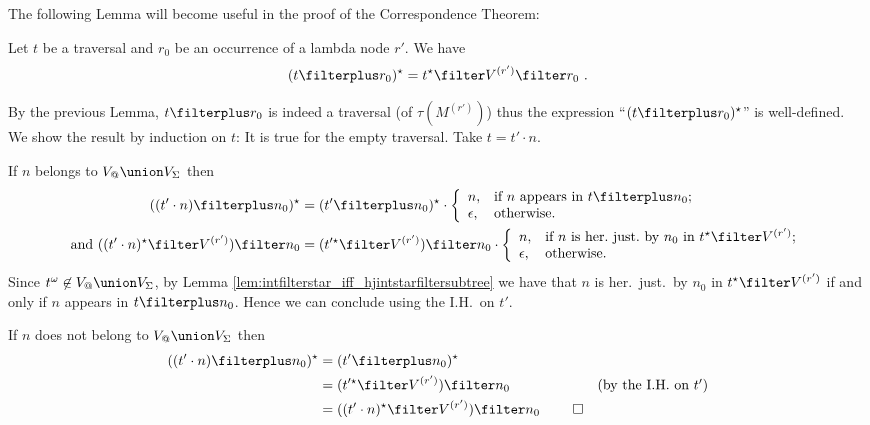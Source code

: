 The following Lemma will become useful in the proof of the Correspondence Theorem:

\begin{lemma} \label{lem:tstarproj_eq_tprojplusstar} Let $t$ be a traversal and $r_0$ be an occurrence of a
lambda node $r'$. We have
\begin{equation*}
(t\filterplus r_0)^\star = t^\star \filter V^{(r')} \filter r_0\ .
\end{equation*}
\end{lemma}
\proof By the previous Lemma, $t\filterplus r_0$ is indeed a
traversal (of $\tau(M^{(r')})$) thus the expression ``$(t\filterplus
r_0)^\star$'' is well-defined. We show the result by induction on
$t$: It is true for the empty traversal. Take $t=t'\cdot n$.

If $n$ belongs to $V_@ \union V_\Sigma$ then
\begin{align*}
((t' \cdot n) \filterplus n_0)^\star &= (t' \filterplus n_0)^\star \cdot
                \left\{
                  \begin{array}{ll}
                    n, & \hbox{if $n$ appears in $t\filterplus n_0$;} \\
                    \epsilon, & \hbox{otherwise.}
                  \end{array}
                \right.
 \\
\mbox{and } ((t' \cdot n)^\star \filter V^{(r')}) \filter n_0 &=
(t'^\star \filter V^{(r')}) \filter n_0
\cdot
                \left\{
                  \begin{array}{ll}
                    n, & \hbox{if $n$ is her.\ just.\ by $n_0$ in $t^\star\filter V^{(r')}$;} \\
                    \epsilon, & \hbox{otherwise.}
                  \end{array}
                \right.
\end{align*}
Since $t^\omega \not\in V_@ \union V_\Sigma$, by Lemma
\ref{lem:intfilterstar_iff_hjintstarfiltersubtree} we have that $n$
is her.\ just.\ by $n_0$ in $t^\star\filter V^{(r')}$ if and only if
$n$ appears in $t\filterplus n_0$. Hence we can conclude using the
I.H.\ on $t'$.


If $n$ does not belong to $V_@ \union V_\Sigma$ then
\begin{align*}
((t' \cdot n) \filterplus n_0)^\star &= (t' \filterplus n_0)^\star \\
&= (t'^\star \filter V^{(r')}) \filter n_0 & \mbox{(by the I.H.\ on $t'$)} \\
&= ((t' \cdot n)^\star \filter V^{(r')}) \filter n_0 \ \qed
\end{align*}

